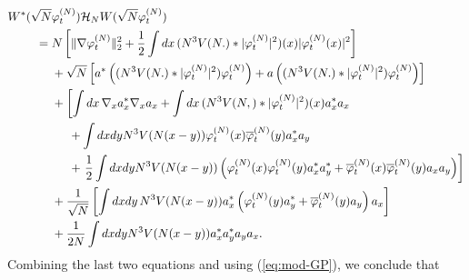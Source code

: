 \documentclass[11pt,a4paper]{article}
\newcommand{\cH}{{\cal H}}
\begin{document}
 \[ \begin{split} W^* (\sqrt{N} &\varphi_t^{(N)}) \cH_N W (\sqrt{N} \varphi_t^{(N)})  \\
= \; & N \left[ \| \nabla \varphi_t^{(N)} \|_2^2 + \frac{1}{2} \int dx \, (N^3 V (N .) * |\varphi_t^{(N)}|^2) (x) |\varphi_t^{(N)} (x)|^2 \right] \\
&+ \sqrt{N} \left[  a^*\left( (N^3 V (N.) *| \varphi_t^{(N)}|^2) \varphi_t^{(N)} \right) + a\left( (N^3 V (N.) *| \varphi_t^{(N)}|^2) \varphi_t^{(N)} \right) \right] \\
&+ \left[ \int dx \, \nabla_x a_x^* \nabla_x a_x + \int dx \, (N^3 V (N,) * |\varphi_t^{(N)}|^2) (x) a_x^* a_x \right. \\ 
&\hspace{.5cm}+ \int dx dy N^3 V(N (x-y)) \varphi_t^{(N)} (x) \overline{\varphi}_t^{(N)} (y) a_x^* a_y \\
&\hspace{.5cm}+ \left.  \frac{1}{2} \int dx dy N^3 V(N (x-y)) \left( \varphi_t^{(N)} (x) \varphi_t^{(N)} (y) a_x^* a_y^* + 
\overline{\varphi}_t^{(N)} (x) \overline{\varphi}_t^{(N)} (y) a_x a_y \right) \right] \\
&+ \frac{1}{\sqrt{N}} \left[  \int dx dy \, N^3 V(N(x-y)) a_x^* \left( \varphi_t^{(N)} (y) a_y^* + \overline{\varphi}_t^{(N)} (y) a_y \right) a_x \right] \\
&+\frac{1}{2N} \int dx dy N^3 V(N (x-y)) a_x^* a_y^* a_y a_x. \end{split} \]
Combining the last two equations and using (\ref{eq:mod-GP}), we conclude that
\end{document}
